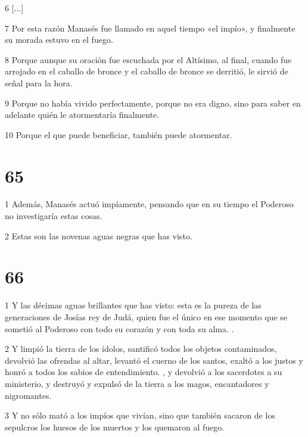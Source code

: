 \par 6 [...]

\par 7 Por esta razón Manasés fue llamado en aquel tiempo «el impío», y finalmente su morada estuvo en el fuego.

\par 8 Porque aunque su oración fue escuchada por el Altísimo, al final, cuando fue arrojado en el caballo de bronce y el caballo de bronce se derritió, le sirvió de señal para la hora.

\par 9 Porque no había vivido perfectamente, porque no era digno, sino para saber en adelante quién le atormentaría finalmente.

\par 10 Porque el que puede beneficiar, también puede atormentar.

\chapter{65}

\par 1 Además, Manasés actuó impíamente, pensando que en su tiempo el Poderoso no investigaría estas cosas.

\par 2 Estas son las novenas aguas negras que has visto.

\chapter{66}

\par 1 Y las décimas aguas brillantes que has visto: esta es la pureza de las generaciones de Josías rey de Judá, quien fue el único en ese momento que se sometió al Poderoso con todo su corazón y con toda su alma. .

\par 2 Y limpió la tierra de los ídolos, santificó todos los objetos contaminados, devolvió las ofrendas al altar, levantó el cuerno de los santos, exaltó a los justos y honró a todos los sabios de entendimiento. , y devolvió a los sacerdotes a su ministerio, y destruyó y expulsó de la tierra a los magos, encantadores y nigromantes.

\par 3 Y no sólo mató a los impíos que vivían, sino que también sacaron de los sepulcros los huesos de los muertos y los quemaron al fuego.


